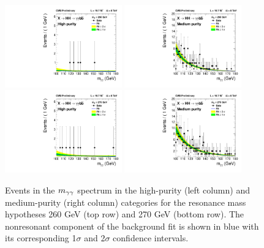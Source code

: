 \begin{figure}[ht!]
 \begin{center}
   \includegraphics[width=0.45\textwidth]{figures/results/databkgoversig_cat0_260GeV.pdf}
   \includegraphics[width=0.45\textwidth]{figures/results/databkgoversig_cat1_260GeV.pdf}
   \includegraphics[width=0.45\textwidth]{figures/results/databkgoversig_cat0_270GeV.pdf}
   \includegraphics[width=0.45\textwidth]{figures/results/databkgoversig_cat1_270GeV.pdf}
 \end{center}
\caption{Events in the $m_{\gamma\gamma}$ spectrum in the high-purity (left column) and medium-purity
(right column) categories for the resonance mass hypotheses 260 GeV (top row) and 270 GeV (bottom row).
The nonresonant component of the background fit is shown in blue
with its corresponding 1$\sigma$ and 2$\sigma$ confidence intervals.}
\label{fig:datafit_260}
\end{figure}

